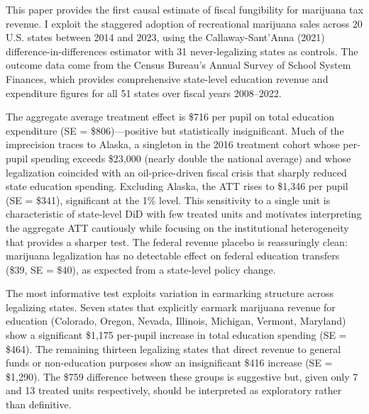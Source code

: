 \documentclass[12pt]{article}
\begin{document}
This paper provides the first causal estimate of fiscal fungibility for marijuana tax revenue. I exploit the staggered adoption of recreational marijuana sales across 20 U.S. states between 2014 and 2023, using the Callaway-Sant'Anna (2021) difference-in-differences estimator with 31 never-legalizing states as controls. The outcome data come from the Census Bureau's Annual Survey of School System Finances, which provides comprehensive state-level education revenue and expenditure figures for all 51 states over fiscal years 2008--2022.

The aggregate average treatment effect is \$716 per pupil on total education expenditure (SE = \$806)---positive but statistically insignificant. Much of the imprecision traces to Alaska, a singleton in the 2016 treatment cohort whose per-pupil spending exceeds \$23,000 (nearly double the national average) and whose legalization coincided with an oil-price-driven fiscal crisis that sharply reduced state education spending. Excluding Alaska, the ATT rises to \$1,346 per pupil (SE = \$341), significant at the 1\% level. This sensitivity to a single unit is characteristic of state-level DiD with few treated units \citep{conley2011inference} and motivates interpreting the aggregate ATT cautiously while focusing on the institutional heterogeneity that provides a sharper test. The federal revenue placebo is reassuringly clean: marijuana legalization has no detectable effect on federal education transfers (\$39, SE = \$40), as expected from a state-level policy change.

The most informative test exploits variation in earmarking structure across legalizing states. Seven states that explicitly earmark marijuana revenue for education (Colorado, Oregon, Nevada, Illinois, Michigan, Vermont, Maryland) show a significant \$1,175 per-pupil increase in total education spending (SE = \$464). The remaining thirteen legalizing states that direct revenue to general funds or non-education purposes show an insignificant \$416 increase (SE = \$1,290). The \$759 difference between these groups is suggestive but, given only 7 and 13 treated units respectively, should be interpreted as exploratory rather than definitive.
\end{document}
